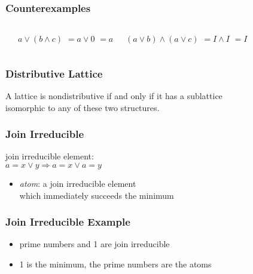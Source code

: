 \documentclass[dvipsnames]{beamer}
\begin{document}
\begin{frame}
  \frametitle{Counterexamples}

  \begin{example}
    \begin{columns}
      \begin{center}
      \end{center}

      \pause
      $a \vee (b \wedge c)$ \pause $= a \vee 0$ \pause $= a$

      \pause
      $(a \vee b) \wedge (a \vee c)$ \pause $= I \wedge I$ \pause $= I$
    \end{columns}
  \end{example}
\end{frame}

\begin{frame}
  \frametitle{Distributive Lattice}

  \begin{theorem}
    A lattice is nondistributive if and only if it has a sublattice\\
    isomorphic to any of these two structures.
  \end{theorem}
\end{frame}

\begin{frame}
  \frametitle{Join Irreducible}

  \begin{definition}
    \alert{join irreducible element}:\\
    $a = x \vee y \Rightarrow a = x \vee a = y$
  \end{definition}

  \pause
  \medskip
  \begin{itemize}
    \item \emph{atom}: a join irreducible element\\
      which immediately succeeds the minimum
  \end{itemize}
\end{frame}

\begin{frame}
  \frametitle{Join Irreducible Example}

  \begin{example}
    \begin{itemize}
      \item prime numbers and 1 are join irreducible

      \pause
      \medskip
      \item 1 is the minimum, the prime numbers are the atoms
    \end{itemize}
  \end{example}
\end{frame}
\end{document}
